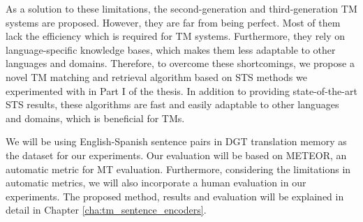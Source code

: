 As a solution to these limitations, the second-generation and third-generation TM systems are proposed. However, they are far from being perfect. Most of them lack the efficiency which is required for TM systems. Furthermore, they rely on language-specific knowledge bases, which makes them less adaptable to other languages and domains. Therefore, to overcome these shortcomings, we propose a novel TM matching and retrieval algorithm based on STS methods we experimented with in Part I of the thesis. In addition to providing state-of-the-art STS results, these algorithms are fast and easily adaptable to other languages and domains, which is beneficial for TMs. 

We will be using English-Spanish sentence pairs in DGT translation memory as the dataset for our experiments. Our evaluation will be based on METEOR, an automatic metric for MT evaluation. Furthermore, considering the limitations in automatic metrics, we will also incorporate a human evaluation in our experiments. The proposed method, results and evaluation will be explained in detail in Chapter \ref{cha:tm_sentence_encoders}.







